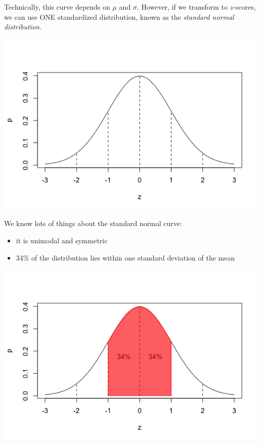 \documentclass[11pt]{article}
\begin{document}
Technically, this curve depends on $\mu$ and $\sigma$.  However, if we transform to $z$-scores, we can use ONE standardized distribution, known as the \emph{standard normal distribution}.

\includegraphics[width=.9\linewidth]{figures/week5/zCurve.png}

We know lots of things about the standard normal curve:
\begin{itemize}
\item it is unimodal and symmetric
\item 34\% of the distribution lies within one standard deviation of the mean
\end{itemize}
\includegraphics[width=.9\linewidth]{figures/week5/oneSD.png}
\end{document}
